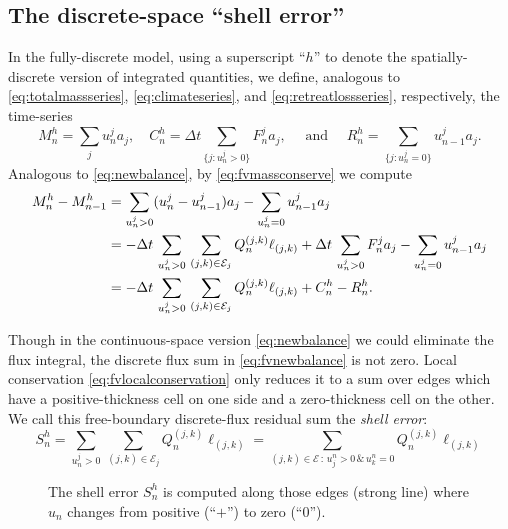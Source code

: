 \documentclass[final,leqno,onefignum,onetabnum]{siamltex1213bueler}
\begin{document}
\subsection{The discrete-space ``shell error''}  \label{subsec:shellerror}  In the fully-discrete model, using a superscript ``$h$'' to denote the spatially-discrete version of integrated quantities, we define, analogous to \eqref{eq:totalmassseries}, \eqref{eq:climateseries}, and \eqref{eq:retreatlossseries}, respectively, the time-series
\begin{equation}
  M_n^h = \sum_j u_n^j a_j, \quad C_n^h = \Delta t\!\!\sum_{\{j:u_n^j>0\}} F_n^j a_j, \quad \text{ and } \quad R_n^h = \sum_{\{j:u_n^j=0\}} u_{n-1}^j a_j.  \label{eq:fvtimeseriesdefn}
\end{equation}
Analogous to \eqref{eq:newbalance}, by \eqref{eq:fvmassconserve} we compute
\begin{align}
M_n^h - M_{n-1}^h &= \sum_{u_n^j>0} (u_n^j - u_{n-1}^j) a_j - \sum_{u_n^j=0} u_{n-1}^j a_j \notag \\
   &= - \Delta t\,\sum_{u_n^j>0}\, \sum_{(j,k)\in\mathcal{E}_j} Q_n^{(j,k)} \ell_{(j,k)} + \Delta t\,\sum_{u_n^j>0} F_n^j a_j - \sum_{u_n^j=0} u_{n-1}^j a_j \notag \\
   &= - \Delta t\,\sum_{u_n^j>0}\, \sum_{(j,k)\in\mathcal{E}_j} Q_n^{(j,k)} \ell_{(j,k)} + C_n^h - R_n^h.  \label{eq:fvnewbalance}
\end{align}

Though in the continuous-space version \eqref{eq:newbalance} we could eliminate the flux integral, the discrete flux sum in \eqref{eq:fvnewbalance} is not zero.  Local conservation \eqref{eq:fvlocalconservation} only reduces it to a sum over edges which have a positive-thickness cell on one side and a zero-thickness cell on the other.  We call this free-boundary discrete-flux residual sum the \emph{shell error}:
\begin{equation}
S_n^h = \sum_{u_n^j>0}\, \sum_{(j,k)\in\mathcal{E}_j} Q_n^{(j,k)} \ell_{(j,k)} = \sum_{(j,k)\in\mathcal{E} \,:\, u_j^n > 0 \,\&\, u_k^n = 0} Q_n^{(j,k)} \ell_{(j,k)} \label{eq:fvderiveshellerror}
\end{equation}

\begin{figure}[ht]
\begin{center}

\end{center}
\caption{The shell error $S_n^h$ is computed along those edges (strong line) where $u_n$ changes from positive (``$+$'') to zero (``$0$'').}
\label{fig:fvmesh-shellerror}
\end{figure}
\end{document}
